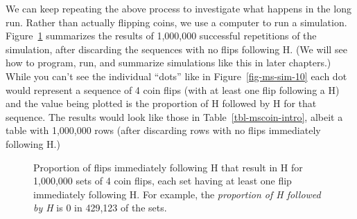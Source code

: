 \documentclass[
  letterpaper,
  DIV=11,
  numbers=noendperiod]{scrreprt}
\theoremstyle{plain}
\theoremstyle{definition}
\theoremstyle{definition}
\theoremstyle{definition}
\theoremstyle{remark}
\begin{document}
We can keep repeating the above process to investigate what happens in
the long run. Rather than actually flipping coins, we use a computer to
run a simulation. Figure~\ref{fig-ms-coin-intro-plot} summarizes the
results of 1,000,000 successful repetitions of the simulation, after
discarding the sequences with no flips following H. (We will see how to
program, run, and summarize simulations like this in later chapters.)
While you can't see the individual ``dots'' like in
Figure~\ref{fig-ms-sim-10} each dot would represent a sequence of 4 coin
flips (with at least one flip following a H) and the value being plotted
is the proportion of H followed by H for that sequence. The results
would look like those in Table~\ref{tbl-mscoin-intro}, albeit a table
with 1,000,000 rows (after discarding rows with no flips immediately
following H.)

\begin{figure}

\begin{minipage}{0.50\linewidth}



\end{minipage}%
%
\begin{minipage}{0.50\linewidth}



\end{minipage}%

\caption{\label{fig-ms-coin-intro-plot}Proportion of flips immediately
following H that result in H for 1,000,000 sets of 4 coin flips, each
set having at least one flip immediately following H. For example, the
\emph{proportion of H followed by H} is 0 in 429,123 of the sets.}

\end{figure}%
\end{document}
